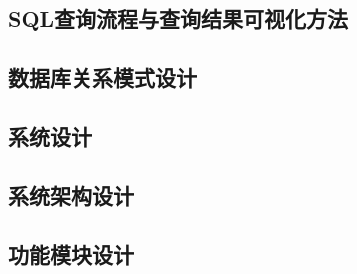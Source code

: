 \documentclass[10.5pt,compsoc,twocolumn]{CjC} %
\theoremstyle{mystyle}
\begin{document}

{\begin{CJK*}{UTF8}{zhhei}\vskip 1mm\subsection{SQL查询流程与查询结果可视化方法}\end{CJK*}}

{\begin{CJK*}{UTF8}{zhhei}\vskip 1mm\section{数据库关系模式设计}\end{CJK*}}
\begin{CJK*}{UTF8}{song}



\end{CJK*}
{\begin{CJK*}{UTF8}{zhhei}\vskip 1mm\section{系统设计}\end{CJK*}}
\begin{CJK*}{UTF8}{song}


\end{CJK*}
{\begin{CJK*}{UTF8}{zhhei}\subsection{系统架构设计}\end{CJK*}}

{\begin{CJK*}{UTF8}{zhhei}\vskip 1mm\subsection{功能模块设计}\end{CJK*}}
\end{document}
